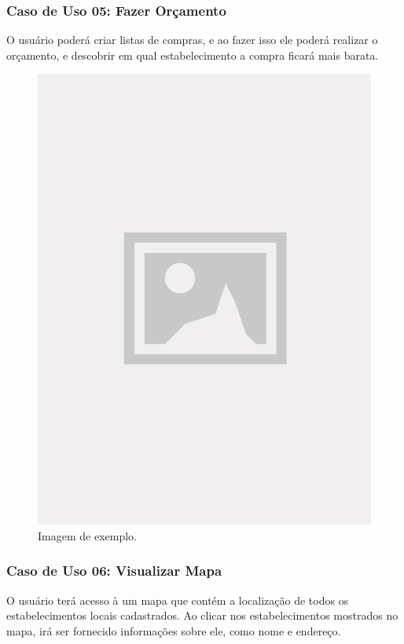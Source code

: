 \subsubsection{Caso de Uso 05: Fazer Orçamento}

O usuário poderá criar listas de compras, e ao fazer isso ele poderá realizar o orçamento, e descobrir em qual estabelecimento a compra ficará mais barata.

\begin{figure}[!htb]
\centering
\caption{Imagem de exemplo.}
\includegraphics[width=\linewidth]{figuras/placeholder.jpg}
\end{figure}

\subsubsection{Caso de Uso 06: Visualizar Mapa}

O usuário terá acesso à um mapa que contém a localização de todos os estabelecimentos locais cadastrados. Ao clicar nos estabelecimentos mostrados no mapa, irá ser fornecido informações sobre ele, como nome e endereço.


